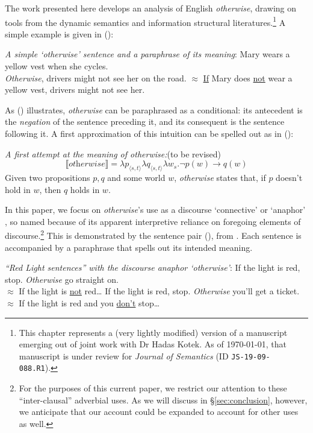 
The work presented here develops an analysis of English \textit{otherwise}, drawing on tools from the dynamic semantics and information structural literatures.\footnote{This chapter represents a (very lightly modified) version of a manuscript emerging out of joint work with Dr Hadas Kotek. As of \today, that manuscript is under review for \textit{Journal of Semantics} (ID \texttt{JS-19-09-088.R1}).} A simple example is given in (\nextx): 

\pex  \textit{A simple \emph{`otherwise'} sentence and a paraphrase of its meaning}:
\a  Mary wears a yellow vest when she cycles.\\\-\hfill \textit{Otherwise}, drivers might not see her on the road.
\a  \color{violet}$\approx$ \uline{If} Mary does \uline{not} wear a yellow vest, drivers might not see her. \xe
\color{black}

As (\lastx) illustrates, \textit{otherwise} can be paraphrased as a conditional: its antecedent is the \textit{negation} of the sentence preceding it, and its consequent is the sentence following it. A first approximation of this intuition can be spelled out as in (\nextx): 
%


\pex  \textit{A first attempt at the meaning of \emph{otherwise}:}\hfill (to be revised)
$$\llbracket  \textit{otherwise} \rrbracket=\lambda p_{ \langle s,t\rangle}\lambda q_{\langle s,t\rangle}\lambda w_s.\neg p(w)\to q(w)$$
Given two propositions $ p,q $ and some world $ w $, \textit{otherwise} states that, if $ p $ doesn't hold in $ w $, then $ q $ holds in $ w $.\xe


In this paper, we focus on \textit{otherwise}'s use as a discourse `connective' or `anaphor' \citep[e.g.][]{Webber2001, Kruijff-Korbayova2001}, so named because of its apparent interpretive reliance on foregoing elements of discourse.\footnote{For the purposes of this current paper, we restrict our attention to these ``inter-clausal'' adverbial uses. As we will discuss in \S\ref{sec:conclusion}, however, we anticipate that our account could be expanded to account for other uses as well.}  This is demonstrated by the sentence pair (\nextx), from \citet[7]{Webber2001}. Each sentence is accompanied by a paraphrase that spells out its intended meaning.


\pex \label{redlightR} \textit{``Red  Light sentences'' with the discourse anaphor \emph{`otherwise'}}:\footnotemark{}
\a  If the light is red, stop. \textit{Otherwise} go straight on.\\
\color{violet}\phantom{If the light is } $\approx$ If the light is \ul{not} red\ldots \label{redlighta}
\color{black}
\vspace{.5\baselineskip}
\a  If the light is red, stop. \textit{Otherwise} you'll get a ticket.\\
\color{violet}\phantom{If the light is } $\approx$ If the light is red and you \ul{don't} stop\ldots \label{redlightb}
\color{black}\xe

